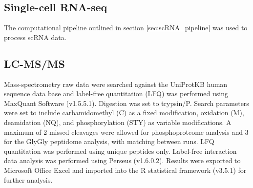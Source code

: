 \subsection{Single-cell RNA-seq}
The computational pipeline outlined in section \ref{sec:scRNA_pipeline} was used to process scRNA data.

\subsection{LC-MS/MS}
Mass-spectrometry raw data were searched against the UniProtKB human sequence data base and label-free quantitation (LFQ) was performed using MaxQuant Software (v1.5.5.1).
Digestion was set to trypsin/P.
Search parameters were set to include carbamidomethyl (C) as a fixed modification, oxidation (M), deamidation (NQ), and phosphorylation (STY) as variable modifications.
A maximum of 2 missed cleavages were allowed for phosphoproteome analysis and 3 for the GlyGly peptidome analysis, with matching between runs.
LFQ quantitation was performed using unique peptides only.
Label-free interaction data analysis was performed using Perseus (v1.6.0.2).
Results were exported to Microsoft Office Excel and imported into the R statistical framework (v3.5.1) for further analysis.


